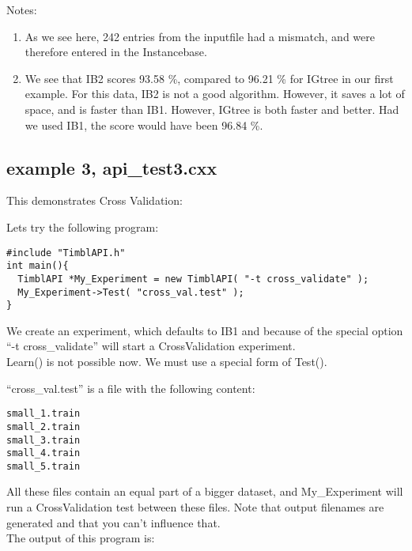 Notes:
\begin{enumerate}
\item As we see here, 242 entries from the inputfile had a mismatch,
and were therefore entered in the Instancebase.
\item We see that IB2 scores 93.58 \%, compared to 96.21 \% for IGtree
in our first example. 
For this data, IB2 is not a good algorithm. However, it saves a
lot of space, and is faster than IB1. However, IGtree is both faster and
better. Had we used IB1, the score would have been 96.84 \%.
\end{enumerate}

\subsection{example 3, api\_test3.cxx}
This demonstrates Cross Validation:

Lets try the following program:

\begin{verbatim}
#include "TimblAPI.h"
int main(){
  TimblAPI *My_Experiment = new TimblAPI( "-t cross_validate" );
  My_Experiment->Test( "cross_val.test" );  
}
\end{verbatim}

We create an experiment, which defaults to IB1 and because of the
special option ``-t cross\_validate'' will start a CrossValidation
experiment.\\
Learn() is not possible now. We must use a special form of Test().

``cross\_val.test'' is a file with the following content:
\begin{verbatim}
small_1.train
small_2.train
small_3.train
small_4.train
small_5.train
\end{verbatim}

All these files contain an equal part of a bigger dataset, and
My\_Experiment will run a CrossValidation test between these files.
Note that output filenames are generated and that you can't influence
that.\\

The output of this program is:


